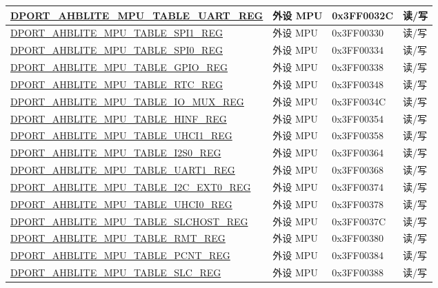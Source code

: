 \begin{longtable}{|L{8.2cm}|L{4.5cm}| l | l | }
\hyperref[regdesc:AHBLITEMPUTABLEUARTREG]{DPORT\_AHBLITE\_MPU\_TABLE\_UART\_REG} & 外设 MPU& 0x3FF0032C & 读/写 \\ \hline
\hyperref[regdesc:AHBLITEMPUTABLESPI1REG]{DPORT\_AHBLITE\_MPU\_TABLE\_SPI1\_REG} & 外设 MPU& 0x3FF00330 & 读/写 \\ \hline
\hyperref[regdesc:AHBLITEMPUTABLESPI0REG]{DPORT\_AHBLITE\_MPU\_TABLE\_SPI0\_REG} & 外设 MPU& 0x3FF00334 & 读/写 \\ \hline
\hyperref[regdesc:AHBLITEMPUTABLEGPIOREG]{DPORT\_AHBLITE\_MPU\_TABLE\_GPIO\_REG} & 外设 MPU& 0x3FF00338 & 读/写 \\ \hline
\hyperref[regdesc:AHBLITEMPUTABLERTCREG]{DPORT\_AHBLITE\_MPU\_TABLE\_RTC\_REG} & 外设 MPU& 0x3FF00348 & 读/写 \\ \hline
\hyperref[regdesc:AHBLITEMPUTABLEIOMUXREG]{DPORT\_AHBLITE\_MPU\_TABLE\_IO\_MUX\_REG} & 外设 MPU& 0x3FF0034C & 读/写 \\ \hline
\hyperref[regdesc:AHBLITEMPUTABLEHINFREG]{DPORT\_AHBLITE\_MPU\_TABLE\_HINF\_REG} & 外设 MPU& 0x3FF00354 & 读/写 \\ \hline
\hyperref[regdesc:AHBLITEMPUTABLEUHCI1REG]{DPORT\_AHBLITE\_MPU\_TABLE\_UHCI1\_REG} & 外设 MPU& 0x3FF00358 & 读/写 \\ \hline
\hyperref[regdesc:AHBLITEMPUTABLEI2S0REG]{DPORT\_AHBLITE\_MPU\_TABLE\_I2S0\_REG} & 外设 MPU& 0x3FF00364 & 读/写 \\ \hline
\hyperref[regdesc:AHBLITEMPUTABLEUART1REG]{DPORT\_AHBLITE\_MPU\_TABLE\_UART1\_REG} & 外设 MPU& 0x3FF00368 & 读/写 \\ \hline
\hyperref[regdesc:AHBLITEMPUTABLEI2CEXT0REG]{DPORT\_AHBLITE\_MPU\_TABLE\_I2C\_EXT0\_REG} & 外设 MPU& 0x3FF00374 & 读/写 \\ \hline
\hyperref[regdesc:AHBLITEMPUTABLEUHCI0REG]{DPORT\_AHBLITE\_MPU\_TABLE\_UHCI0\_REG} & 外设 MPU& 0x3FF00378 & 读/写 \\ \hline
\hyperref[regdesc:AHBLITEMPUTABLESLCHOSTREG]{DPORT\_AHBLITE\_MPU\_TABLE\_SLCHOST\_REG} & 外设 MPU& 0x3FF0037C & 读/写 \\ \hline
\hyperref[regdesc:AHBLITEMPUTABLERMTREG]{DPORT\_AHBLITE\_MPU\_TABLE\_RMT\_REG} & 外设 MPU& 0x3FF00380 & 读/写 \\ \hline
\hyperref[regdesc:AHBLITEMPUTABLEPCNTREG]{DPORT\_AHBLITE\_MPU\_TABLE\_PCNT\_REG} & 外设 MPU& 0x3FF00384 & 读/写 \\ \hline
\hyperref[regdesc:AHBLITEMPUTABLESLCREG]{DPORT\_AHBLITE\_MPU\_TABLE\_SLC\_REG} & 外设 MPU& 0x3FF00388 & 读/写 \\ \hline

\end{longtable}
